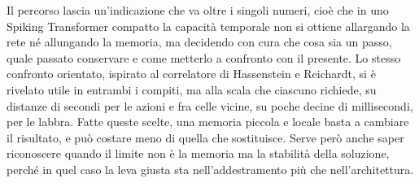 Il percorso lascia un'indicazione che va oltre i singoli numeri, cioè che in uno Spiking Transformer compatto la capacità temporale non si ottiene allargando la rete né allungando la memoria, ma decidendo con cura che cosa sia un passo, quale passato conservare e come metterlo a confronto con il presente. Lo stesso confronto orientato, ispirato al correlatore di Hassenstein e Reichardt, si è rivelato utile in entrambi i compiti, ma alla scala che ciascuno richiede, su distanze di secondi per le azioni e fra celle vicine, su poche decine di millisecondi, per le labbra. Fatte queste scelte, una memoria piccola e locale basta a cambiare il risultato, e può costare meno di quella che sostituisce. Serve però anche saper riconoscere quando il limite non è la memoria ma la stabilità della soluzione, perché in quel caso la leva giusta sta nell'addestramento più che nell'architettura.

